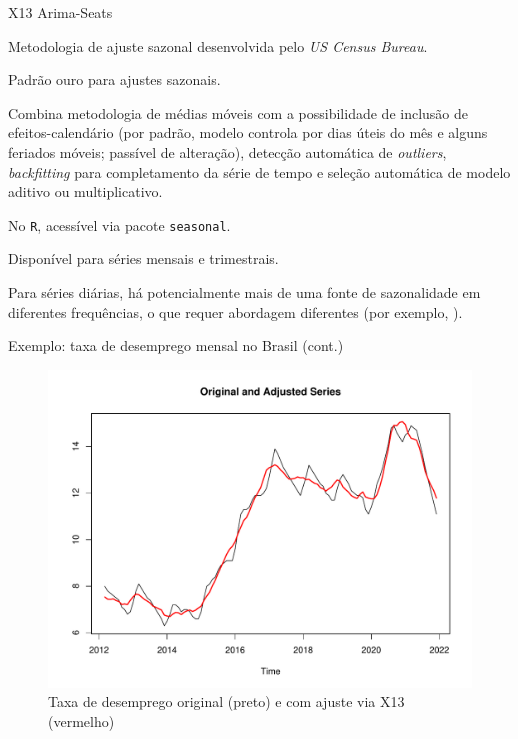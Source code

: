 \documentclass[11pt]{beamer}
\newenvironment{wideitemize}{\itemize\addtolength{\itemsep}{10pt}}{\enditemize}
\newenvironment{halfwideitemize}{\itemize\addtolength{\itemsep}{0.5em}}{\enditemize}
\begin{document}
\begin{frame}{X13 Arima-Seats}
	\begin{wideitemize}
		\item Metodologia de ajuste sazonal desenvolvida pelo \textit{US Census Bureau}.
		\item Padrão ouro para ajustes sazonais.
		\begin{halfwideitemize}
			\item Combina metodologia de médias móveis com a possibilidade de inclusão de efeitos-calendário (por padrão, modelo controla por dias úteis do mês e alguns feriados móveis; passível de alteração), detecção automática de \textit{outliers}, \textit{backfitting} para completamento da série de tempo e seleção automática de modelo aditivo ou multiplicativo. 
		\end{halfwideitemize}
				\item No \texttt{R}, acessível via pacote \texttt{seasonal}.
		\item Disponível para séries mensais e trimestrais.
		\begin{halfwideitemize}
			\item Para séries diárias, há potencialmente mais de uma fonte de sazonalidade em diferentes frequências, o que requer abordagem diferentes (por exemplo, \cite{DeLivera2012}).
		\end{halfwideitemize}
	\end{wideitemize}
\end{frame}

\begin{frame}{Exemplo: taxa de desemprego mensal no Brasil (cont.)}
	\begin{figure}
		\caption{Taxa de desemprego original (preto) e com ajuste via X13 (vermelho)}
		\includegraphics[scale=0.4]{graficos/desemprego_x13.pdf}
	\end{figure}
\end{frame}
\end{document}
